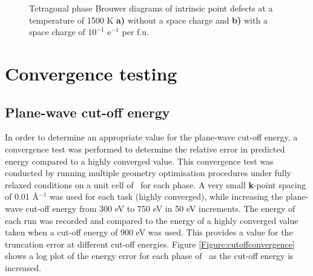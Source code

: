 \begin{figure}[htp]
\begin{center}
		\caption{Tetragonal phase Brouwer diagrams of intrinsic point defects at a temperature of 1500 K \textbf{a)} without a space charge and \textbf{b)} with a space charge of $10^{-1}$ e$^{-1}$ per f.u.}
		\label{figure:spacechargeexample}
	\end{center}
\end{figure}

\section{Convergence testing} \label{section:convergence}

\subsection{Plane-wave cut-off energy}

In order to determine an appropriate value for the plane-wave cut-off energy, a convergence test was performed to determine the relative error in predicted energy compared to a highly converged value. This convergence test was conducted by running multiple geometry optimisation procedures under fully relaxed conditions on a unit cell of \zirconia\ for each phase. A very small \textbf{k}-point spacing of 0.01 \r{A}$^{-1}$ was used for each task (highly converged), while increasing the plane-wave cut-off energy from 300 eV to 750 eV in 50 eV increments. The energy of each run was recorded and compared to the energy of a highly converged value taken when a cut-off energy of 900 eV was used. This provides a value for the truncation error at different cut-off energies. Figure \ref{Figure:cutoffconvergence} shows a log plot of the energy error for each phase of \zirconia\ as the cut-off energy is increased. 

